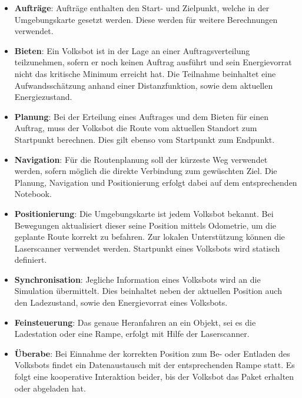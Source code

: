 \begin{itemize}

\item \textbf{Aufträge}: Aufträge enthalten den Start- und Zielpunkt, welche in der Umgebungskarte gesetzt werden. Diese werden für weitere Berechnungen verwendet.

\item \textbf{Bieten}: Ein Volksbot ist in der Lage an einer Auftragsverteilung teilzunehmen, sofern er noch keinen Auftrag ausführt und sein Energievorrat nicht das kritische Minimum erreicht hat. Die Teilnahme beinhaltet eine Aufwandsschätzung anhand einer Distanzfunktion, sowie dem aktuellen Energiezustand. 

\item \textbf{Planung}: Bei der Erteilung eines Auftrages und dem Bieten für einen Auftrag, muss der Volksbot die Route vom aktuellen Standort zum Startpunkt berechnen. Dies gilt ebenso vom Startpunkt zum Endpunkt.

\item \textbf{Navigation}: Für die Routenplanung soll der kürzeste Weg verwendet werden, sofern möglich die direkte Verbindung zum gewüschten Ziel. Die Planung, Navigation und Positionierung erfolgt dabei auf dem entsprechenden Notebook.

\item \textbf{Positionierung}: Die Umgebungskarte ist jedem Volksbot bekannt. Bei Bewegungen aktualisiert dieser seine Position mittels Odometrie, um die geplante Route korrekt zu befahren. Zur lokalen Unterstützung können die Laserscanner verwendet werden. Startpunkt eines Volksbots wird statisch definiert.

\item \textbf{Synchronisation}: Jegliche Information eines Volksbots wird an die Simulation übermittelt. Dies beinhaltet neben der aktuellen Position auch den Ladezustand, sowie den Energievorrat eines Volksbots.

\item \textbf{Feinsteuerung}: Das genaue Heranfahren an ein Objekt, sei es die Ladestation oder eine Rampe, erfolgt mit Hilfe der Laserscanner. 

\item \textbf{Überabe}: Bei Einnahme der korrekten Position zum Be- oder Entladen des Volksbots findet ein Datenaustausch mit der entsprechenden Rampe statt. Es folgt eine kooperative Interaktion beider, bis der Volksbot das Paket erhalten oder abgeladen hat.


\end{itemize}
